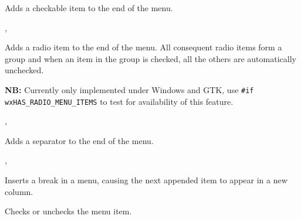 \label{wxmenuappendcheckitem}


Adds a checkable item to the end of the menu.


,\rtfsp
{}

\label{wxmenuappendradioitem}


Adds a radio item to the end of the menu. All consequent radio items form a
group and when an item in the group is checked, all the others are
automatically unchecked.

{\bf NB:} Currently only implemented under Windows and GTK, use
{\tt\#if wxHAS\_RADIO\_MENU\_ITEMS} to test for availability of this feature.


,\rtfsp
{}

\label{wxmenuappendseparator}


Adds a separator to the end of the menu.


,\rtfsp
{}

\label{wxmenubreak}


Inserts a break in a menu, causing the next appended item to appear in a new column.

\label{wxmenucheck}


Checks or unchecks the menu item.



